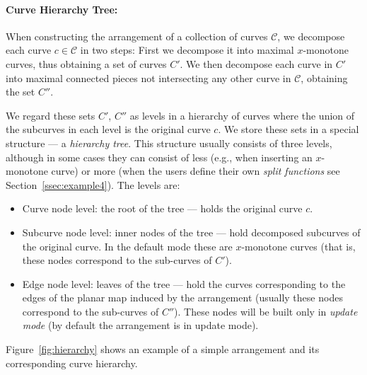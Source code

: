 \paragraph{Curve Hierarchy Tree:} When constructing the arrangement of a
collection of curves ${\mathcal C}$, we decompose each curve $c \in 
{\mathcal C}$ in two steps: First we decompose it into maximal $x$-monotone 
curves, thus obtaining a set of curves $C'$. We then decompose each curve 
in $C'$ into maximal connected pieces not intersecting any other curve in 
${\mathcal C}$, obtaining the set $C''$.

We regard these sets $C'$, $C''$ as levels in a hierarchy of curves where the 
union of the subcurves in each level is the original curve $c$. We store these
sets in a special structure --- a {\em hierarchy tree}. This structure 
usually consists of three levels, although in some cases they can consist 
of less (e.g., when inserting an $x$-monotone curve) or more (when the users 
define their own {\em split functions} see Section~\ref{ssec:example4}). 
The levels are:
\begin{itemize}
\item Curve node level: the root of the tree --- holds the original curve $c$.
\item Subcurve node level: inner nodes of the tree --- hold decomposed
subcurves of the original curve. In the default mode these are $x$-monotone 
curves (that is, these nodes correspond to the sub-curves of $C'$).
\item Edge node level: leaves of the tree --- hold the curves corresponding to
the edges of the planar map induced by the arrangement (usually these nodes 
correspond to the sub-curves of $C''$). \newline
These nodes will be built only in {\em update mode} (by default the 
arrangement is in update mode).
\end{itemize}

Figure~\ref{fig:hierarchy} shows an example of a simple arrangement and its 
corresponding curve hierarchy.


